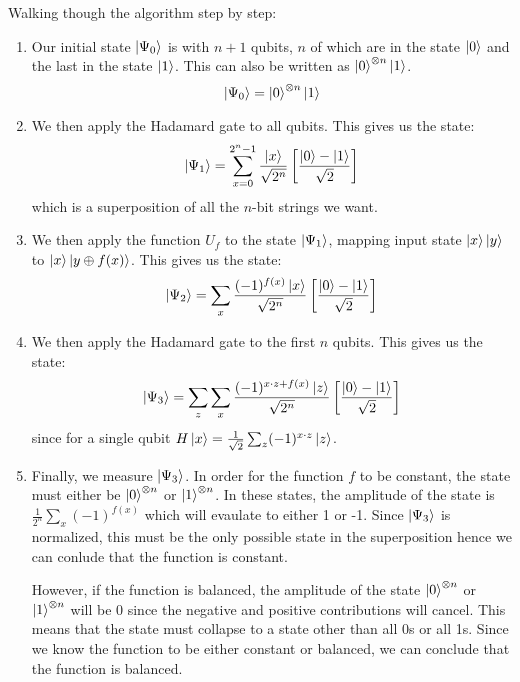 \documentclass[reqno]{amsart}
\numberwithin{equation}{section}
\numberwithin{figure}{section}
\begin{document}
\begin{justify}
Walking though the algorithm step by step:
    \begin{enumerate}
        \item Our initial state $\ket{\Psi_{0}}$ is with $n+1$ qubits, $n$ of which are in the state $\ket{0}$ and the last in the state $\ket{1}$. This can also be written as $\ket{0}^{\otimes n}\ket{1}$.
            \begin{equation*}
                \ket{\Psi_{0}} = \ket{0}^{\otimes n}\ket{1}
            \end{equation*}
        \item We then apply the Hadamard gate to all qubits. This gives us the state:
            \begin{equation*}
                \ket{\Psi_{1}} = \sum\limits_{x=0}^{2^{n}-1}\frac{\ket{x}}{\sqrt{2^{n}}}\left[\frac{\ket{0} - \ket{1}}{\sqrt{2}}\right]
            \end{equation*}
            which is a superposition of all the $n$-bit strings we want.
        \item We then apply the function $U_{f}$ to the state $\ket{\Psi_{1}}$, mapping input state $\ket{x}\ket{y}$ to $\ket{x}\ket{y \oplus f(x)}$. This gives us the state:
            \begin{equation*}
                \ket{\Psi_{2}} = \sum\limits_{x}\frac{(-1)^{f(x)}\ket{x}}{\sqrt{2^{n}}}\left[\frac{\ket{0} - \ket{1}}{\sqrt{2}}\right]
            \end{equation*}
        \item We then apply the Hadamard gate to the first $n$ qubits. This gives us the state:
            \begin{equation*}
                \ket{\Psi_{3}} = \sum\limits_{z}\sum\limits_{x}\frac{(-1)^{x \cdot z + f(x)}\ket{z}}{\sqrt{2^{n}}}\left[\frac{\ket{0} - \ket{1}}{\sqrt{2}}\right]
            \end{equation*}
            since for a single qubit $H\ket{x} = \frac{1}{\sqrt{2}}\sum_{z}(-1)^{x \cdot z}\ket{z}$.
        \item Finally, we measure $\ket{\Psi_{3}}$. In order for the function $f$ to be constant, the state must either be $\ket{0}^{\otimes n}$ or $\ket{1}^{\otimes n}$. In these states, the amplitude of the state is $\frac{1}{2^{n}}\sum_{x}(-1)^{f(x)}$ which will evaulate to either 1 or -1. Since $\ket{\Psi_{3}}$ is normalized, this must be the only possible state in the superposition hence we can conlude that the function is constant.

            However, if the function is balanced, the amplitude of the state $\ket{0}^{\otimes n}$ or $\ket{1}^{\otimes n}$ will be 0 since the negative and positive contributions will cancel. This means that the state must collapse to a state other than all 0s or all 1s. Since we know the function to be either constant or balanced, we can conclude that the function is balanced.
    \end{enumerate}


\end{justify}
\end{document}
